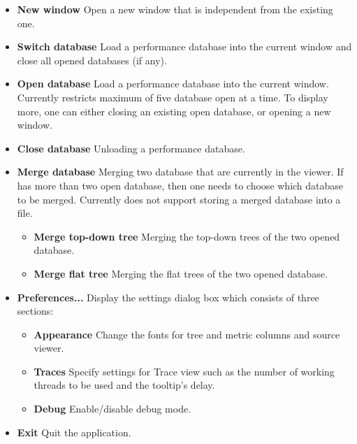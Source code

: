 \documentclass[english]{article}
\begin{document}
\begin{itemize}
\item \textbf{New window}
  Open a new  window that is independent from the existing one.

\item \textbf{Switch database}
  Load a performance database into the current  window and close all opened databases (if any).

\item \textbf{Open database}
  Load a performance database into the current  window.
  Currently  restricts maximum of five database open at a time.
  To display more, one can either closing an existing open database, or opening a new  window.

\item \textbf{Close database}
  Unloading a performance database.

\item \textbf{Merge database}
  Merging two database that are currently in the viewer. If  has more than two
  open database, then one needs to choose which database to be merged.
  Currently  does not support storing a merged database into a file.

  \begin{itemize}
   \item \textbf{Merge top-down tree} Merging the top-down trees of the two opened database.
   \item \textbf{Merge flat tree} Merging the flat trees of the two opened database.
  \end{itemize}

\item \textbf{Preferences...}
  Display the settings dialog box which consists of three sections:
  \begin{itemize}
     \item \textbf{Appearance} Change the fonts for tree and metric columns and source viewer.
     \item \textbf{Traces} Specify settings for Trace view such as the number of working threads to be used and the tooltip's delay.
     \item \textbf{Debug} Enable/disable debug mode.
  \end{itemize}

\item \textbf{Exit}
  Quit the  application.

\end{itemize}
\end{document}
